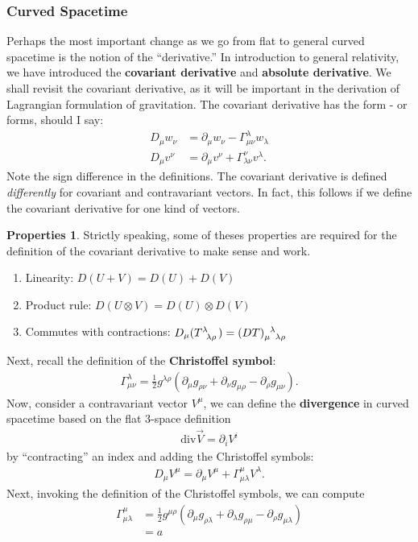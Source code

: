\documentclass[a4paper,11pt]{article}
\numberwithin{equation}{section}
\theoremstyle{definition}
\newtheorem{propty}{Properties}[section]
\newcommand{\p}{\partial}
\begin{document}
\subsubsection{Curved Spacetime}
Perhaps the most important change as we go from flat to general curved spacetime is the notion of the ``derivative.'' In introduction to general relativity, we have introduced the \textbf{covariant derivative} and \textbf{absolute derivative}. We shall revisit the covariant derivative, as it will be important in the derivation of Lagrangian formulation of gravitation. The covariant derivative has the form - or forms, should I say:
\begin{align*}
D_\mu w_\nu &= \p_\mu w_\nu - \Gamma^\lambda_{\mu\nu}w_\lambda\\
D_\mu v^\nu &= \p_\mu v^\nu + \Gamma^\nu_{\lambda\nu}v^\lambda.
\end{align*}
Note the sign difference in the definitions. The covariant derivative is defined \textit{differently} for covariant and contravariant vectors. In fact, this follows if we define the covariant derivative for one kind of vectors.
\begin{propty}
	Strictly speaking, some of theses properties are required for the definition of the covariant derivative to make sense and work. 
	\begin{enumerate}
		\item Linearity: $D(U+V) = D(U) + D(V)$
		\item Product rule: $D(U\otimes V) = D(U)\otimes D(V)$
		\item Commutes with contractions: $D_\mu(\tensor{T}{^{\lambda}_{\lambda\rho}}) = \tensor{(DT)}{_\mu^\lambda_{\lambda\rho}}$
	\end{enumerate}
\end{propty} 
Next, recall the definition of the \textbf{Christoffel symbol}:
\begin{align*}
\Gamma^{\lambda}_{\mu\nu} = \frac{1}{2}g^{\lambda\rho}\left(
   \p_{\mu}g_{\rho\nu}
 + \p_{\nu}g_{\mu\rho}
 - \p_{\rho}g_{\mu\nu}
 \right).
\end{align*}
Now, consider a contravariant vector $V^\mu$, we can define the \textbf{divergence} in curved spacetime based on the flat 3-space definition
\begin{align*}
\text{div}\vec{V} = \p_i V^i
\end{align*}
by ``contracting'' an index and adding the Christoffel symbols:
\begin{align*}
D_\mu V^\mu = \p_\mu V^\mu + \Gamma^\mu_{\mu\lambda}V^\lambda.
\end{align*}
Next, invoking the definition of the Christoffel symbols, we can compute 
\begin{align*}
\Gamma^\mu_{\mu\lambda} &= \frac{1}{2}g^{\mu\rho}(\p_\mu g_{\rho\lambda} + \p_\lambda g_{\rho\mu} - \p_\rho g_{\mu\lambda})\\
&= a
\end{align*}
\end{document}
